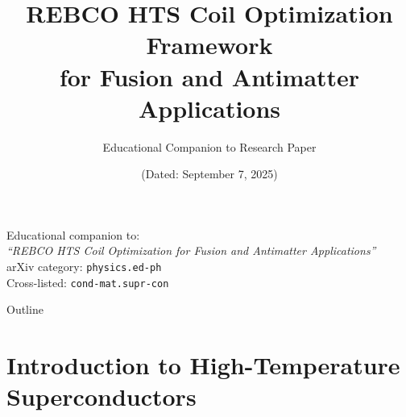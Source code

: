 \documentclass[aspectratio=169,xcolor={table,dvipsnames}]{beamer}
\title[REBCO HTS Coil Optimization]{REBCO HTS Coil Optimization Framework\\for Fusion and Antimatter Applications}
\subtitle{Educational Companion to Research Paper}
\author[\authorname]{\authorname}
\institute[Independent Researcher]{Independent Researcher}
\date{(Dated: September 7, 2025)}
\begin{document}
\begin{frame}
    \titlepage
    \begin{center}
        \small
        Educational companion to:\\
        \textit{``REBCO HTS Coil Optimization for Fusion and Antimatter Applications''}\\
        \vspace{0.3cm}
        arXiv category: \texttt{physics.ed-ph}\\
        Cross-listed: \texttt{cond-mat.supr-con}
    \end{center}
\end{frame}

\begin{frame}{Outline}
    \tableofcontents
\end{frame}

\section{Introduction to High-Temperature Superconductors}
\end{document}
